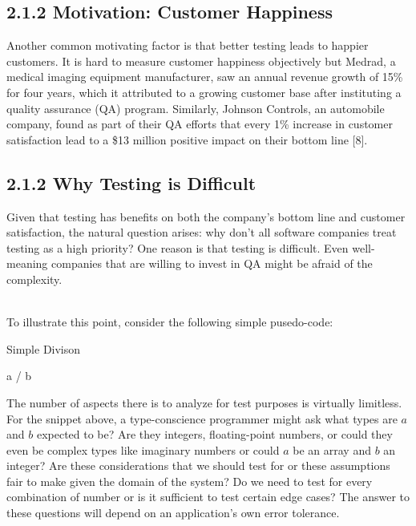 \documentclass[12pt]{report}
\begin{document}
\subsection*{2.1.2 Motivation: Customer Happiness}
\par\noindent
Another common motivating factor is that better testing leads to happier customers. It is hard to measure customer happiness objectively but Medrad, a medical imaging equipment manufacturer, saw an annual revenue growth of 15\% for four years, which it attributed to a growing customer base after instituting a quality assurance (QA) program. Similarly, Johnson Controls, an automobile company, found as part of their QA efforts that every 1\% increase in customer satisfaction lead to a \$13 million positive impact on their bottom line [8].

\subsection*{2.1.2 Why Testing is Difficult}
\par\noindent
Given that testing has benefits on both the company's bottom line and customer satisfaction, the natural question arises: why don't all software companies treat testing as a high priority? One reason is that testing is difficult. Even well-meaning companies that are willing to invest in QA might be afraid of the complexity.
\par\indent \\
To illustrate this point, consider the following simple pusedo-code:

\begin{algorithm}
	\caption{Simple Divison}
	\begin{algorithmic}
	
	  \State \Return a / b
	\EndFunction
	\end{algorithmic}
\end{algorithm}

\par\noindent
The number of aspects there is to analyze for test purposes is virtually limitless. For the snippet above, a type-conscience programmer might ask what types are $a$ and $b$ expected to be? Are they integers, floating-point numbers, or could they even be complex types like imaginary numbers or could $a$ be an array and $b$ an integer? Are these considerations that we should test for or these assumptions fair to make given the domain of the system? Do we need to test for every combination of number or is it sufficient to test certain edge cases? The answer to these questions will depend on an application's own error tolerance. \\
\end{document}
